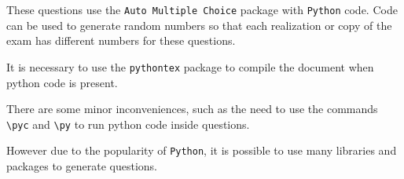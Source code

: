 \documentclass[a4paper]{article}
\begin{document}
These questions use the \texttt{Auto Multiple Choice} package with \texttt{Python} code.
Code can be used to generate random numbers so that each realization or copy of the exam has different numbers for these questions.

It is necessary to use the \texttt{pythontex} package to compile the document when python code is present.

There are some minor inconveniences, such as the need to use the commands \texttt{\textbackslash{}pyc{}} and \texttt{\textbackslash{}py{}} to run python code inside questions.

However due to the popularity of \texttt{Python}, it is possible to use many libraries and packages to generate questions.

\end{document}
